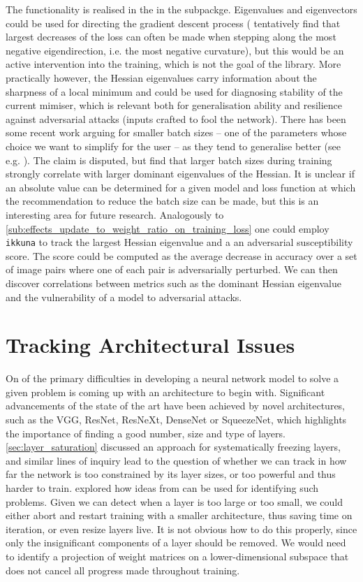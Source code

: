 The functionality is realised in the  in the
 subpackge. Eigenvalues and eigenvectors could
be used for directing the gradient descent process (\citet{alain2018negative}
tentatively find that largest decreases of the loss can often be made when
stepping along the most negative eigendirection, i.e. the most negative
curvature), but this would be an active intervention into the training, which is
not the goal of the library. More practically however, the Hessian eigenvalues
carry information about the sharpness of a local minimum and could be used for
diagnosing stability of the current mimiser, which is relevant both for
generalisation ability and resilience against adversarial attacks (inputs
crafted to fool the network). There has been some recent work arguing for
smaller batch sizes -- one of the parameters whose choice we want to simplify
for the user -- as they tend to generalise better (see e.g.
\citep{keskar2016large}). The claim is disputed, but \citet{yao2018hessian} find
that larger batch sizes during training strongly correlate with larger dominant
eigenvalues of the Hessian. It is unclear if an absolute value can be determined
for a given model and loss function at which the recommendation to reduce the
batch size can be made, but this is an interesting area for future research.
Analogously to \cref{sub:effects_update_to_weight_ratio_on_training_loss} one
could employ \texttt{ikkuna} to track the largest Hessian eigenvalue and a an
adversarial susceptibility score. The score could be computed as the average
decrease in accuracy over a set of image pairs where one of each pair is
adversarially perturbed. We can then discover correlations between metrics such
as the dominant Hessian eigenvalue and the vulnerability of a model to
adversarial attacks.


\section{Tracking Architectural Issues}%
\label{sec:tracking_architecture}

On of the primary difficulties in developing a neural network model to solve a
given problem is coming up with an architecture to begin with. Significant
advancements of the state of the art have been achieved by novel architectures,
such as the VGG, ResNet, ResNeXt, DenseNet or SqueezeNet, which highlights the
importance of finding a good number, size and type of layers.
\cref{sec:layer_saturation} discussed an approach for systematically freezing
layers, and similar lines of inquiry lead to the question of whether we can
track in how far the network is too constrained by its layer sizes, or too
powerful and thus harder to train. \citet{shenk2018} explored how ideas from
\citep{raghu2017svcca} can be used for identifying such problems. Given we can
detect when a layer is too large or too small, we could either abort and restart
training with a smaller architecture, thus saving time on iteration, or even
resize layers live. It is not obvious how to do this properly, since only the
insignificant components of a layer should be removed. We would need to identify
a projection of weight matrices on a lower-dimensional subspace that does not
cancel all progress made throughout training.
